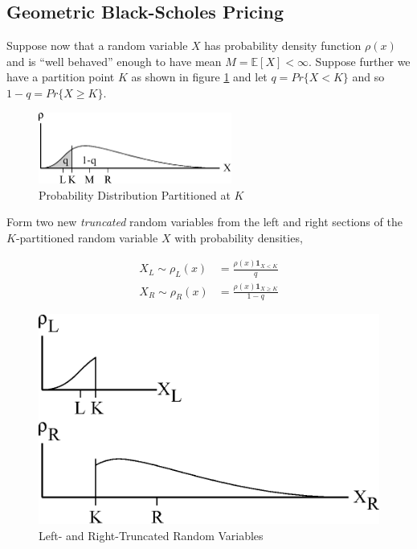 \subsection{Geometric Black-Scholes Pricing}

Suppose now that a random variable $X$ has probability density function $\rho(x)$ and is ``well behaved'' enough to have mean $M = \mathbb{E}[X] < \infty$. Suppose further we have a partition point $K$ as shown in figure \ref{fig:S_T_K_generic} and let $q = Pr\{X < K\}$ and so $1 - q = Pr\{X \ge K\}$.

\begin{figure}
  \centering
  \includegraphics[width=2.5in]{Images/S_T_K.eps}
  \caption[Probability Distribution Partitioned at $K$]
          {Probability Distribution Partitioned at $K$}
  \label{fig:S_T_K_generic}
\end{figure}

Form two new \emph{truncated} random variables from the left and right sections of the $K$-partitioned random variable $X$ with probability densities,

\begin{align*}
X_L \sim \rho_L(x) &= \frac{\rho(x) \mathbf{1}_{X < K}}{q}\\
X_R \sim \rho_R(x) &= \frac{\rho(x) \mathbf{1}_{X \ge K}}{1-q}
\end{align*}

\begin{figure}
  \centering
  \includegraphics{Images/XL_XR.eps}
  \caption[Left- and Right-Truncated Random Variables]
          {Left- and Right-Truncated Random Variables}
  \label{fig:XL_XR}
\end{figure}

